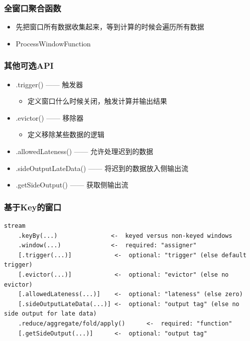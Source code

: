 \documentclass{beamer}
\begin{document}
  \begin{frame}
      \frametitle{全窗口聚合函数}
  
      \begin{itemize}
          \item 先把窗口所有数据收集起来，等到计算的时候会遍历所有数据
          \item ProcessWindowFunction
      \end{itemize}
  
  \end{frame}

  \begin{frame}
      \frametitle{其他可选API}
  
      \begin{itemize}
          \item .trigger() —— 触发器
          \begin{itemize}
              \item 定义窗口什么时候关闭，触发计算并输出结果
          \end{itemize}
          \item .evictor() —— 移除器
          \begin{itemize}
              \item 定义移除某些数据的逻辑
          \end{itemize}
          \item .allowedLateness() —— 允许处理迟到的数据
          \item .sideOutputLateData() —— 将迟到的数据放入侧输出流
          \item .getSideOutput() —— 获取侧输出流
      \end{itemize}
  
  \end{frame}

  \begin{frame}[fragile]
      \frametitle{基于Key的窗口}
  
\begin{verbatim}
stream
    .keyBy(...)               <-  keyed versus non-keyed windows
    .window(...)              <-  required: "assigner"
    [.trigger(...)]            <-  optional: "trigger" (else default trigger)
    [.evictor(...)]            <-  optional: "evictor" (else no evictor)
    [.allowedLateness(...)]    <-  optional: "lateness" (else zero)
    [.sideOutputLateData(...)] <-  optional: "output tag" (else no side output for late data)
    .reduce/aggregate/fold/apply()      <-  required: "function"
    [.getSideOutput(...)]      <-  optional: "output tag"
\end{verbatim}
  
  \end{frame}
\end{document}
